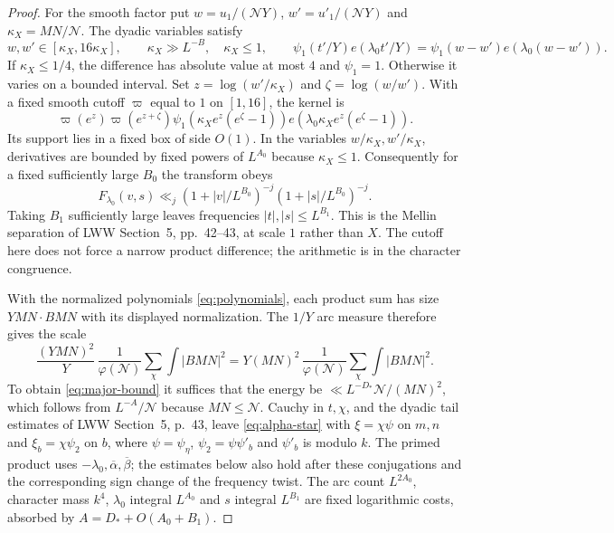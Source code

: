 \documentclass[11pt]{article}
\theoremstyle{definition}
\newcommand{\ph}{\varphi}
\newcommand{\GN}{\mathcal N}
\theoremstyle{remark}
\numberwithin{equation}{section}
\begin{document}
\begin{proof}
For the smooth factor put
$w=u_1/(\GN Y)$, $w'=u'_1/(\GN Y)$ and
$\kappa_X=MN/\GN$. The dyadic variables satisfy
\begin{equation}\label{eq:natural-scale}
 w,w'\in[\kappa_X,16\kappa_X],\qquad
 \kappa_X\gg L^{-B},\quad\kappa_X\le1,
 \qquad
 \psi_1(t'/Y)e(\lambda_0t'/Y)
       =\psi_1(w-w')e(\lambda_0(w-w')).
\end{equation}
If $\kappa_X\le1/4$, the difference has absolute value at most
$4$ and $\psi_1=1$. Otherwise it varies on a bounded interval.
Set $z=\log(w'/\kappa_X)$ and $\zeta=\log(w/w')$.
With a fixed smooth cutoff $\varpi$ equal to $1$ on $[1,16]$,
the kernel is
\begin{equation}\label{eq:mellin-kernel}
 \varpi(e^z)\varpi(e^{z+\zeta})
 \psi_1(\kappa_Xe^z(e^\zeta-1))
 e(\lambda_0\kappa_Xe^z(e^\zeta-1)).
\end{equation}
Its support lies in a fixed box of side $O(1)$.
In the variables $w/\kappa_X,w'/\kappa_X$, derivatives are bounded
by fixed powers of $L^{A_0}$ because $\kappa_X\le1$.
Consequently for a fixed sufficiently large $B_0$ the transform obeys
\begin{equation}\label{eq:mellin-decay}
 F_{\lambda_0}(v,s)\ll_j
 (1+|v|/L^{B_0})^{-j}(1+|s|/L^{B_0})^{-j}.
\end{equation}
Taking $B_1$ sufficiently large leaves frequencies
$|t|,|s|\le L^{B_1}$. This is the Mellin separation of LWW
Section~5, pp.~42--43, at scale $1$ rather than $X$.
The cutoff here does not force a narrow product difference;
the arithmetic is in the character congruence.

With the normalized polynomials \eqref{eq:polynomials}, each product
sum has size $YMN\cdot BMN$ with its displayed normalization.
The $1/Y$ arc measure therefore gives the scale
\begin{equation}\label{eq:major-normalization}
 \frac{(YMN)^2}{Y}\,\frac1{\ph(\GN)}
       \sum_\chi\int|BMN|^2
 =Y(MN)^2\,\frac1{\ph(\GN)}\sum_\chi\int|BMN|^2.
\end{equation}
To obtain \eqref{eq:major-bound} it suffices that the energy be
$\ll L^{-D_*}\GN/(MN)^2$, which follows from
$L^{-A}/\GN$ because $MN\le\GN$.
Cauchy in $t,\chi$, and the dyadic tail estimates of LWW
Section~5, p.~43, leave \eqref{eq:alpha-star} with
$\xi=\chi\psi$ on $m,n$ and $\xi_b=\chi\psi_2$ on $b$,
where $\psi=\psi_\eta$, $\psi_2=\psi\psi'_b$ and
$\psi'_b$ is modulo $k$. The primed product uses
$-\lambda_0,\overline\alpha,\overline\beta$; the estimates below
also hold after these conjugations and the corresponding sign
change of the frequency twist.
The arc count $L^{2A_0}$, character mass $k^4$, $\lambda_0$ integral
$L^{A_0}$ and $s$ integral $L^{B_1}$ are fixed logarithmic costs,
absorbed by $A=D_*+O(A_0+B_1)$.


\end{proof}
\end{document}
